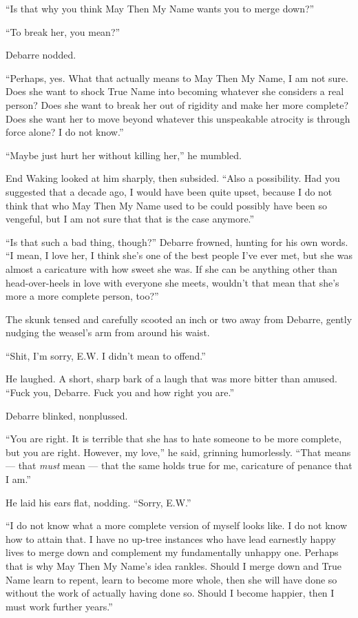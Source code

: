 ``Is that why you think May Then My Name wants you to merge down?''

``To break her, you mean?''

Debarre nodded.

``Perhaps, yes. What that actually means to May Then My Name, I am not sure. Does she want to shock True Name into becoming whatever she considers a real person? Does she want to break her out of rigidity and make her more complete? Does she want her to move beyond whatever this unspeakable atrocity is through force alone? I do not know.''

``Maybe just hurt her without killing her,'' he mumbled.

End Waking looked at him sharply, then subsided. ``Also a possibility. Had you suggested that a decade ago, I would have been quite upset, because I do not think that who May Then My Name used to be could possibly have been so vengeful, but I am not sure that that is the case anymore.''

``Is that such a bad thing, though?'' Debarre frowned, hunting for his own words. ``I mean, I love her, I think she's one of the best people I've ever met, but she was almost a caricature with how sweet she was. If she can be anything other than head-over-heels in love with everyone she meets, wouldn't that mean that she's more a more complete person, too?''

The skunk tensed and carefully scooted an inch or two away from Debarre, gently nudging the weasel's arm from around his waist.

``Shit, I'm sorry, E.W. I didn't mean to offend.''

He laughed. A short, sharp bark of a laugh that was more bitter than amused. ``Fuck you, Debarre. Fuck you and how right you are.''

Debarre blinked, nonplussed.

``You are right. It is terrible that she has to hate someone to be more complete, but you are right. However, my love,'' he said, grinning humorlessly. ``That means — that \emph{must} mean — that the same holds true for me, caricature of penance that I am.''

He laid his ears flat, nodding. ``Sorry, E.W.''

``I do not know what a more complete version of myself looks like. I do not know how to attain that. I have no up-tree instances who have lead earnestly happy lives to merge down and complement my fundamentally unhappy one. Perhaps that is why May Then My Name's idea rankles. Should I merge down and True Name learn to repent, learn to become more whole, then she will have done so without the work of actually having done so. Should I become happier, then I must work further years.''

